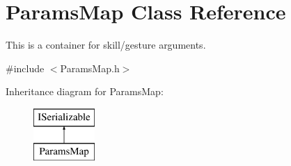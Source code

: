 \hypertarget{class_params_map}{}\section{Params\+Map Class Reference}
\label{class_params_map}


This is a container for skill/gesture arguments.  




{\ttfamily \#include $<$Params\+Map.\+h$>$}

Inheritance diagram for Params\+Map\+:\begin{figure}[H]
\begin{center}
\leavevmode
\includegraphics[height=2.000000cm]{class_params_map}
\end{center}
\end{figure}
